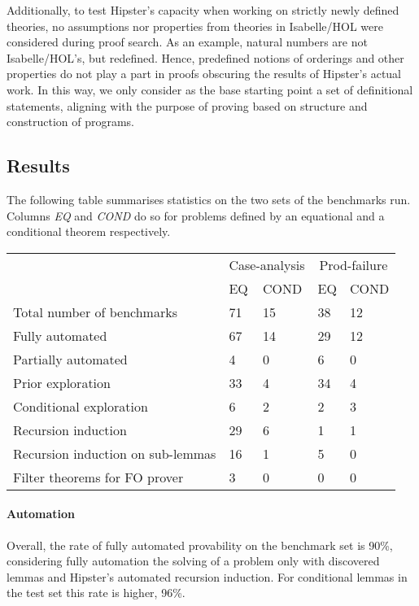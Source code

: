 Additionally, to test Hipster's capacity when working on strictly newly defined theories, no assumptions nor properties from theories in Isabelle/HOL were considered during proof search.
%
As an example, natural numbers are not Isabelle/HOL's, but redefined.
%
Hence, predefined notions of orderings and other properties do not play a part in proofs obscuring the results of Hipster's actual work.
%
In this way, we only consider as the base starting point a set of definitional statements, aligning with the purpose of proving based on structure and construction of programs.

\subsection{Results}

The following table summarises statistics on the two sets of the benchmarks run.
%
Columns \emph{EQ} and \emph{COND} do so for problems defined by an equational and a conditional theorem respectively.

\begin{tabularx}{\textwidth}{l | X X | X X}
  & \multicolumn{2}{c|}{Case-analysis} & \multicolumn{2}{c}{Prod-failure} \\
  &  EQ & COND & EQ & COND \\
  \hline
  Total number of benchmarks & 71 & 15 & 38 & 12 \\
  \hline
  Fully automated & 67 & 14 & 29 & 12 \\
  Partially automated & 4 & 0 & 6 & 0 \\
  \hline
  Prior exploration & 33 & 4 & 34 & 4 \\
  Conditional exploration & 6 & 2 & 2 & 3 \\
  \hline
  Recursion induction & 29 & 6 & 1 & 1 \\
  Recursion induction on sub-lemmas & 16 & 1 & 5 & 0 \\
  \hline
  Filter theorems for FO prover & 3 & 0 & 0 & 0 \\ %
\end{tabularx}

\paragraph{Automation}
%
Overall, the rate of fully automated provability on the benchmark set is 90\%, considering fully automation the solving of a problem only with discovered lemmas and Hipster's automated recursion induction.
%
For conditional lemmas in the test set this rate is higher, 96\%.

